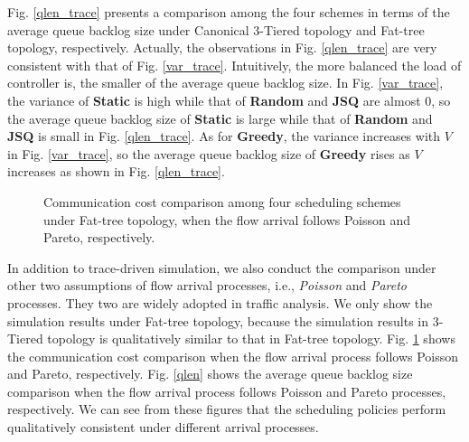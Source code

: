 \documentclass[10pt,journal,compsoc]{IEEEtran}
\begin{document}
Fig. \ref{qlen_trace} presents a comparison among the four schemes in terms of the average queue backlog size under Canonical 3-Tiered topology and Fat-tree topology, respectively. Actually, the observations in Fig. \ref{qlen_trace} are very consistent with that of Fig. \ref{var_trace}. Intuitively, the more balanced the load of controller is, the smaller of the average queue backlog size. In Fig. \ref{var_trace}, the variance of \textbf{Static} is high while that of \textbf{Random} and \textbf{JSQ} are almost $0$, so the average queue backlog size of \textbf{Static} is large while that of \textbf{Random} and \textbf{JSQ} is small in Fig. \ref{qlen_trace}. As for \textbf{Greedy}, the variance increases with $V$ in Fig. \ref{var_trace}, so the average queue backlog size of \textbf{Greedy}  rises as $V$ increases as shown in Fig. \ref{qlen_trace}.

\begin{figure}[!t]
\centering
 \caption{Communication cost comparison among four scheduling schemes under Fat-tree topology, when the flow arrival follows Poisson and Pareto, respectively.}
 \label{cost}
\end{figure}

In addition to trace-driven simulation, we also conduct the comparison under other two assumptions of flow arrival processes, i.e., \emph{Poisson} and \emph{Pareto} processes. They two are widely adopted in traffic analysis. 
We only show the simulation results under Fat-tree topology, because the simulation results in 3-Tiered topology is qualitatively similar to that in Fat-tree topology.  Fig. \ref{cost} shows the communication cost comparison when the flow arrival process follows Poisson and Pareto, respectively. Fig. \ref{qlen} shows the average queue backlog size comparison when the flow arrival process follows Poisson and Pareto processes, respectively. We can see from these figures that the scheduling policies perform qualitatively consistent under different arrival processes.
\end{document}
